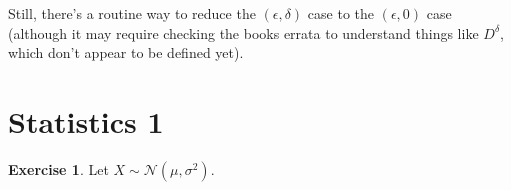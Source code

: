 \documentclass{article}
\theoremstyle{definition}
\newtheorem{exercise}{Exercise}[section]
\begin{document}
Still, there's a routine way to reduce the $(\epsilon,\delta)$ case to the $(\epsilon,0)$ case (although it may require checking the books errata to understand things like $D^\delta$, which don't appear to be defined yet).

\section{Statistics 1}
\begin{exercise}
Let $X\sim \mathcal{N}(\mu,\sigma^2)$.
\end{exercise}
\end{document}
